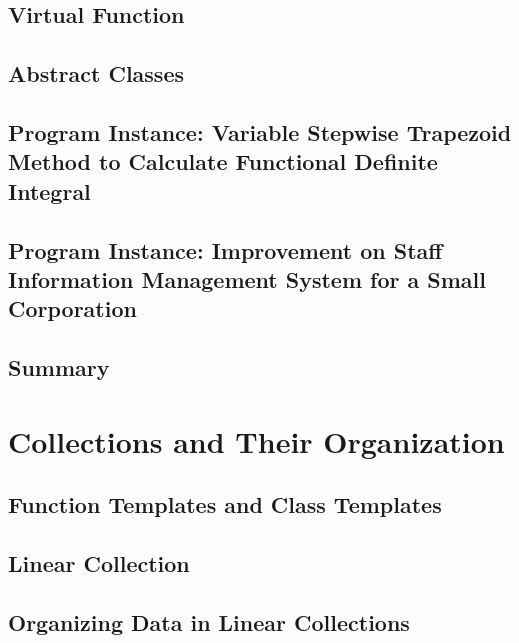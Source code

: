 \documentclass[a4paper]{article}
\begin{document}
\subsection{Virtual Function}

\subsection{Abstract Classes}

\subsection{Program Instance: Variable Stepwise Trapezoid Method to Calculate Functional Definite Integral}

\subsection{Program Instance: Improvement on Staff Information Management System for a Small Corporation}

\subsection{Summary}

\newpage
\section{Collections and Their Organization}
\subsection{Function Templates and Class Templates}

\subsection{Linear Collection}

\subsection{Organizing Data in Linear Collections}
\end{document}
